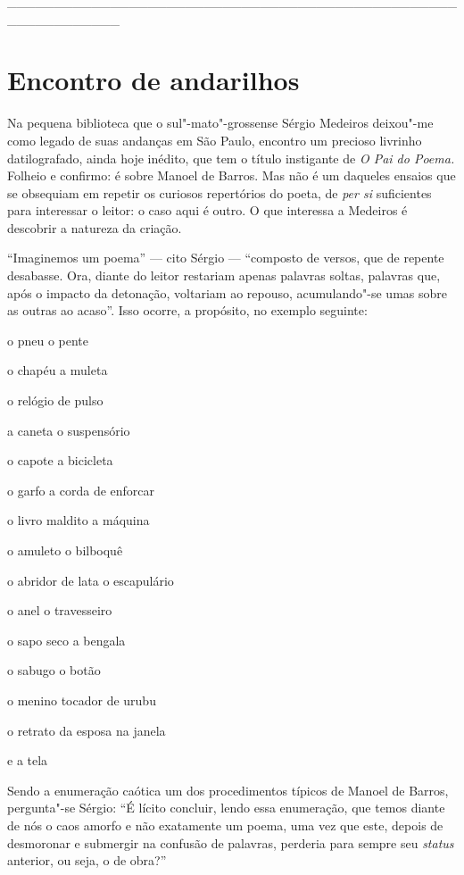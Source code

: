 \_\_\_\_\_\_\_\_\_\_\_\_\_\_\_\_\_\_\_\_\_\_\_\_\_\_\_\_\_\_\_\_\_\_\_\_\_\_\_\_\_\_\_\_\_\_\_\_\_\_\_\_\_\_\_\_\_\_\_\_

\chapter{Encontro de andarilhos}

Na pequena biblioteca que o sul"-mato"-grossense Sérgio Medeiros deixou"-me
como legado de suas andanças em São Paulo, encontro um precioso livrinho
datilografado, ainda hoje inédito, que tem o título instigante de
\emph{O Pai do Poema.} Folheio e confirmo: é sobre Manoel de Barros. Mas
não é um daqueles ensaios que se obsequiam em repetir os curiosos
repertórios do poeta, de \emph{per si} suficientes para interessar o
leitor: o caso aqui é outro. O que interessa a Medeiros é descobrir a
natureza da criação.

``Imaginemos um poema'' --- cito Sérgio --- ``composto de versos, que de
repente desabasse. Ora, diante do leitor restariam apenas palavras
soltas, palavras que, após o impacto da detonação, voltariam ao repouso,
acumulando"-se umas sobre as outras ao acaso''. Isso ocorre, a propósito,
no exemplo seguinte:

o pneu o pente

o chapéu a muleta

o relógio de pulso

a caneta o suspensório

o capote a bicicleta

o garfo a corda de enforcar

o livro maldito a máquina

o amuleto o bilboquê

o abridor de lata o escapulário

o anel o travesseiro

o sapo seco a bengala

o sabugo o botão

o menino tocador de urubu

o retrato da esposa na janela

e a tela

Sendo a enumeração caótica um dos procedimentos típicos de Manoel de
Barros, pergunta"-se Sérgio: ``É lícito concluir, lendo essa enumeração,
que temos diante de nós o caos amorfo e não exatamente um poema, uma vez
que este, depois de desmoronar e submergir na confusão de palavras,
perderia para sempre seu \emph{status} { } anterior, ou seja, o de
obra?''

